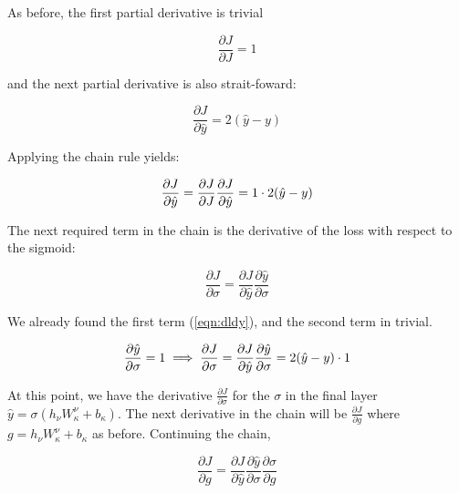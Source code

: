 \noindent As before, the first partial derivative is trivial

\begin{equation}
    \frac{\partial J}{\partial J} = 1
\end{equation}

\noindent and the next partial derivative is also strait-foward:

\begin{equation}
\frac{\partial J}{\partial \hat{y}} = 2(\hat{y} - y )
\end{equation}

\noindent Applying the chain rule yields:

\begin{equation}
\label{eqn:dldy}
\frac{\partial J}{\partial \hat{y}} = \frac{\partial J}{\partial J}\frac{\partial J}{\partial \hat{y}} \\
= 1 \cdot 2(\hat{y} - y )
\end{equation}

\noindent The next required term in the chain is the derivative of the loss with respect to the sigmoid:

\begin{equation}
\frac{\partial J}{\partial \sigma} = \frac{\partial J}{\partial \hat{y}} \frac{\partial \hat{y}}{\partial \sigma}
\end{equation}

\noindent We already found the first term (\ref{eqn:dldy}), and the second term in trivial.

\begin{equation}
    \frac{\partial \hat{y}}{\partial \sigma} = 1 \\
    \implies \frac{\partial J}{\partial \sigma} =  \frac    {\partial J}{\partial \hat{y}} \frac{\partial \hat{y}}  {\partial \sigma} \\
    = 2(\hat{y} - y ) \cdot 1
\end{equation}

\noindent At this point, we have the derivative $ \frac{\partial J}{\partial \sigma} $ for the $ \sigma $ in the final layer $ \hat{y} = \sigma \left( h_\nu W_\kappa ^\nu + b_\kappa \right) $. The next derivative in the chain will be $ \frac{\partial J}{\partial g} $ where $ g = h_\nu W_\kappa ^\nu + b_\kappa $ as before. Continuing the chain,

\begin{equation}
\frac{\partial J}{\partial g} = \frac{\partial J}{\partial \hat{y}} \frac{\partial \hat{y}}{\partial \sigma} \frac{\partial \sigma}{\partial g}
\end{equation}

